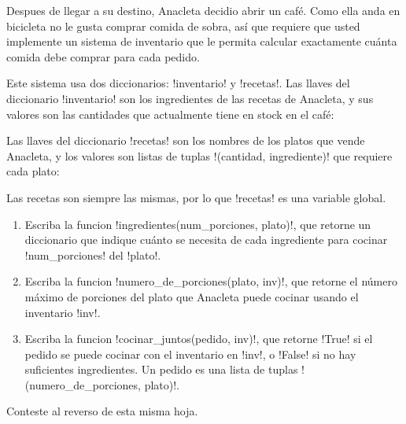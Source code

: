 Despues de llegar a su destino,
Anacleta decidio abrir un café.
Como ella anda en bicicleta
no le gusta comprar comida de sobra,
así que requiere que usted implemente un sistema de inventario
que le permita calcular exactamente
cuánta comida debe comprar para cada pedido.

Este sistema usa dos diccionarios: \li!inventario! y \li!recetas!.
Las llaves del diccionario \li!inventario!
son los ingredientes de las recetas de Anacleta,
y sus valores son las cantidades que actualmente tiene en stock en el café:


Las llaves del diccionario \li!recetas!
son los nombres de los platos que vende Anacleta,
y los valores son listas de tuplas \li!(cantidad, ingrediente)!
que requiere cada plato:

Las recetas son siempre las mismas,
por lo que \li!recetas! es una variable global.

\begin{enumerate}[leftmargin=0pt,label=\emph{\alph*})]

  \item
    Escriba la funcion \li!ingredientes(num_porciones, plato)!,
    que retorne un diccionario que indique
    cuánto se necesita de cada ingrediente
    para cocinar \li!num_porciones! del \li!plato!.
    

  \item
    Escriba la funcion \li!numero_de_porciones(plato, inv)!,
    que retorne el número máximo de porciones del plato
    que Anacleta puede cocinar usando el inventario \li!inv!.
    

  \item
    Escriba la funcion \li!cocinar_juntos(pedido, inv)!,
    que retorne \li!True! si el pedido se puede cocinar
    con el inventario en \li!inv!,
    o \li!False! si no hay suficientes ingredientes.
    Un pedido es una lista de tuplas \li!(numero_de_porciones, plato)!.
    

\end{enumerate}


Conteste al reverso de esta misma hoja.

